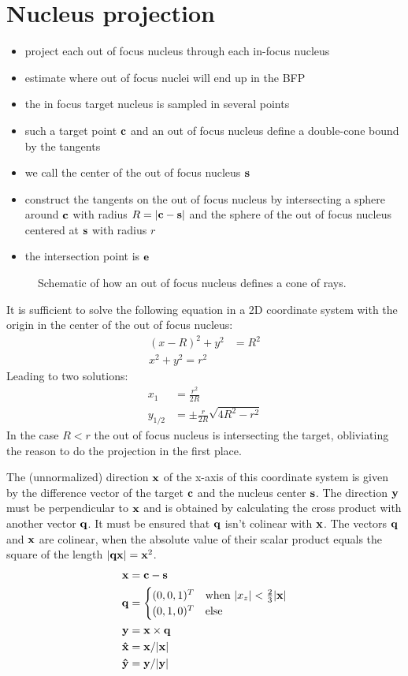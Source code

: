 \documentclass[twocolumn,DIV19]{scrartcl}
\begin{document}
\section{Nucleus projection}
\begin{itemize}
\item project each out of focus nucleus through each in-focus nucleus 
\item estimate where out of focus nuclei will end up in the BFP
\item the in focus target nucleus is sampled in several points
\item such a target point $\mathbf{c}$ and an out of focus nucleus define a
  double-cone bound by the tangents
\item we call the center of the out of focus nucleus $\mathbf{s}$
\item construct the tangents on the out of focus nucleus by
  intersecting a sphere around $\mathbf{c}$ with radius $R=\mathopen| \mathbf{c}-\mathbf{s} \mathclose|$ and
  the sphere of the out of focus nucleus centered at $\mathbf{s}$ with radius
  $r$
\item the intersection point is $\mathbf{e}$
\end{itemize}

\begin{figure}[!hbt]
  \centering
  
  \caption{Schematic of how an out of focus nucleus defines a cone of
    rays.}
\end{figure}
It is sufficient to solve the following equation in a 2D coordinate
system with the origin in the center of the out of focus nucleus:
\begin{align}
  (x-R)^2+y^2&=R^2\\
  x^2+y^2=r^2
\end{align}
Leading to two solutions:
\begin{align}
  x_1&=\frac{r^2}{2R}\\
  y_{1/2}&=\pm\frac{r}{2R}\sqrt{4R^2-r^2}
\end{align}
In the case $R<r$ the out of focus nucleus is intersecting the target,
obliviating the reason to do the projection in the first place.

The (unnormalized) direction $\mathbf{x}$ of the x-axis of this coordinate
system is given by the difference vector of the target $\mathbf{c}$ and the
nucleus center $\mathbf{s}$. The direction $\mathbf{y}$ must be perpendicular to $\mathbf{x}$
and is obtained by calculating the cross product with another vector
$\mathbf{q}$.  It must be ensured that $\mathbf{q}$ isn't colinear with $\mathbf{x}$. The
vectors $\mathbf{q}$ and $\mathbf{x}$ are colinear, when the absolute value of their
scalar product equals the square of the length $\mathopen| \mathbf{q}\mathbf{x} \mathclose|=\mathbf{x}^2$.
\begin{align}
  \mathbf{x}&=\mathbf{c}-\mathbf{s}\\
  \mathbf{q}&=\begin{cases}
    (0,0,1)^T & \textrm{when}\ \mathopen| x_z \mathclose|<\frac{2}{3}\mathopen| \mathbf{x} \mathclose|\\
    (0,1,0)^T & \textrm{else}
  \end{cases}\\
  \mathbf{y}&=\mathbf{x}\times\mathbf{q} \\
  \mathbf{\hat{x}}&=\mathbf{x}/\mathopen| \mathbf{x} \mathclose|\\
  \mathbf{\hat{y}}&=\mathbf{y}/\mathopen| \mathbf{y} \mathclose|
\end{align}
\end{document}
